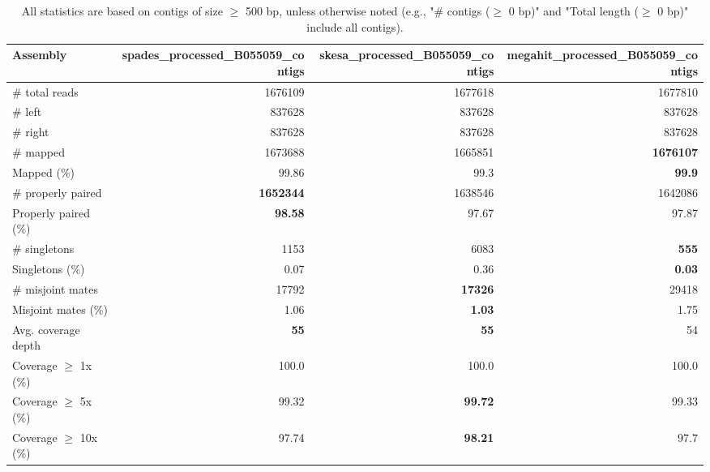 \documentclass[12pt,a4paper]{article}
\begin{document}
\begin{table}[ht]
\begin{center}
\caption{All statistics are based on contigs of size $\geq$ 500 bp, unless otherwise noted (e.g., "\# contigs ($\geq$ 0 bp)" and "Total length ($\geq$ 0 bp)" include all contigs).}
\begin{tabular}{|l*{3}{|r}|}
\hline
Assembly & spades\_processed\_B055059\_contigs & skesa\_processed\_B055059\_contigs & megahit\_processed\_B055059\_contigs \\ \hline
\# total reads & 1676109 & 1677618 & 1677810 \\ \hline
\# left & 837628 & 837628 & 837628 \\ \hline
\# right & 837628 & 837628 & 837628 \\ \hline
\# mapped & 1673688 & 1665851 & {\bf 1676107} \\ \hline
Mapped (\%) & 99.86 & 99.3 & {\bf 99.9} \\ \hline
\# properly paired & {\bf 1652344} & 1638546 & 1642086 \\ \hline
Properly paired (\%) & {\bf 98.58} & 97.67 & 97.87 \\ \hline
\# singletons & 1153 & 6083 & {\bf 555} \\ \hline
Singletons (\%) & 0.07 & 0.36 & {\bf 0.03} \\ \hline
\# misjoint mates & 17792 & {\bf 17326} & 29418 \\ \hline
Misjoint mates (\%) & 1.06 & {\bf 1.03} & 1.75 \\ \hline
Avg. coverage depth & {\bf 55} & {\bf 55} & 54 \\ \hline
Coverage $\geq$ 1x (\%) & 100.0 & 100.0 & 100.0 \\ \hline
Coverage $\geq$ 5x (\%) & 99.32 & {\bf 99.72} & 99.33 \\ \hline
Coverage $\geq$ 10x (\%) & 97.74 & {\bf 98.21} & 97.7 \\ \hline
\end{tabular}
\end{center}
\end{table}
\end{document}
